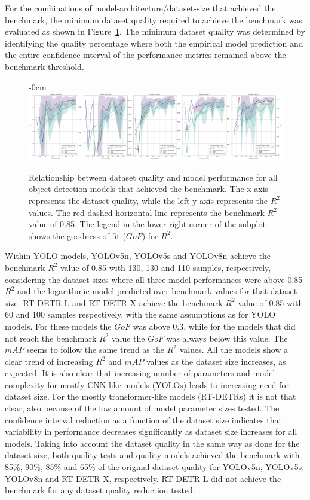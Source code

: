 \documentclass[12pt,a4paper,oneside]{report}
\newlength{\extralength}
\begin{document}
For the combinations of model-architecture/dataset-size that achieved the benchmark,
the minimum dataset quality required to achieve the benchmark was evaluated as
shown in Figure~\ref{fig:dataset_quality}. The minimum dataset quality was determined by identifying 
the quality percentage where both the empirical model prediction and the entire confidence interval 
of the performance metrics remained above the benchmark threshold.

\begin{figure}[H]
  \centering
  \begin{adjustwidth}{-\extralength}{0cm}
  \includegraphics[width=18cm]{Plots/r2_ap_vs_dataset_quality.pdf}
  \caption{Relationship between dataset quality and model performance for all object detection models
  that achieved the benchmark. The x-axis represents the dataset quality, while 
  the left y-axis represents the $R^2$ values.
  The red dashed horizontal line represents the benchmark $R^2$ value of 0.85. The
  legend in the lower right corner of the subplot shows the goodness of fit ($GoF$) for $R^2$.}
  \label{fig:dataset_quality}
  \end{adjustwidth}   
\end{figure}

Within YOLO models, YOLOv5n, YOLOv5s and YOLOv8n achieve the benchmark $R^2$ 
value of 0.85 with 130, 130 and 110 samples, respectively, considering the dataset
sizes where all three model performances were above 0.85 $R^2$ and the logarithmic
model predicted over-benchmark values for that dataset size.
RT-DETR L and RT-DETR X achieve the benchmark $R^2$ value of 0.85 with 60 and 100 samples
respectively, with the same assumptions as for YOLO models.
For these models the $GoF$ was above 0.3, while for the models that did
not reach the benchmark $R^2$ value the $GoF$ was always below this value.
The $mAP$ seems to follow the same trend as the $R^2$ values.
All the models show a clear trend of increasing $R^2$ and $mAP$
values as the dataset size increases, as expected.
It is also clear that increasing number of parameters and model complexity for
mostly CNN-like models (YOLOs) leads to increasing need for dataset size.
For the mostly transformer-like models (RT-DETRs) it is not that clear, also because of
the low amount of model parameter sizes tested.
The confidence interval reduction as a function of the dataset size indicates that 
variability in performance decreases significantly as dataset size increases for 
all models.
Taking into account the dataset quality in the same way as done for the dataset size,
both quality tests and quality models achieved the benchmark with 85\%, 90\%, 85\% and
65\% of the original dataset quality for YOLOv5n, YOLOv5s, YOLOv8n and RT-DETR X, respectively.
RT-DETR L did not achieve the benchmark for any dataset quality reduction tested.
\end{document}
